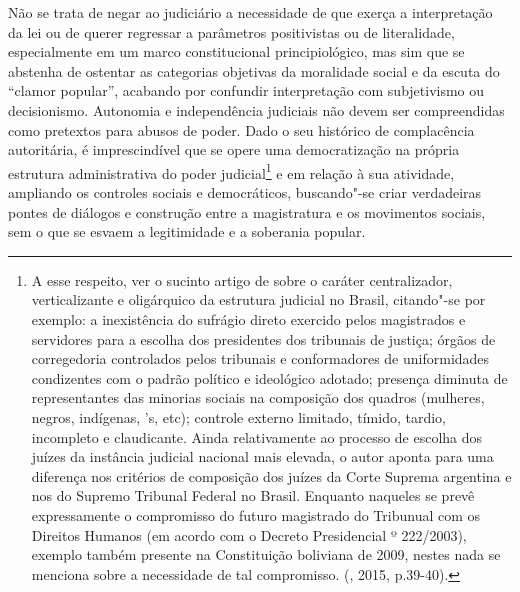 Não se trata de negar ao judiciário a necessidade de que exerça a
interpretação da lei ou de querer regressar a parâmetros positivistas ou
de literalidade, especialmente em um marco constitucional
principiológico, mas sim que se abstenha de ostentar as categorias
objetivas da moralidade social e da escuta do ``clamor popular'', acabando
por confundir interpretação com subjetivismo ou decisionismo. Autonomia
e independência judiciais não devem ser compreendidas como pretextos
para abusos de poder. Dado o seu histórico de complacência autoritária,
é imprescindível que se opere uma democratização na própria estrutura
administrativa do poder judicial\footnote{A esse respeito, ver o sucinto
  artigo de  sobre o caráter centralizador, verticalizante
  e oligárquico da estrutura judicial no Brasil, citando"-se por exemplo:
  a inexistência do sufrágio direto exercido pelos magistrados e
  servidores para a escolha dos presidentes dos tribunais de justiça;
  órgãos de corregedoria controlados pelos tribunais e conformadores de
  uniformidades condizentes com o padrão político e ideológico adotado;
  presença diminuta de representantes das minorias sociais na composição
  dos quadros (mulheres, negros, indígenas, 's, etc); controle
  externo limitado, tímido, tardio, incompleto e claudicante. Ainda
  relativamente ao processo de escolha dos juízes da instância judicial
  nacional mais elevada, o autor aponta para uma diferença nos critérios
  de composição dos juízes da Corte Suprema argentina e nos do Supremo
  Tribunal Federal no Brasil. Enquanto naqueles se prevê expressamente o
  compromisso do futuro magistrado do Tribunual com os Direitos Humanos
  (em acordo com o Decreto Presidencial º 222/2003), exemplo também
  presente na Constituição boliviana de 2009, nestes nada se menciona
  sobre a necessidade de tal compromisso. (, 2015,
  p.39-40).} e em relação à sua atividade, ampliando os controles
sociais e democráticos, buscando"-se criar verdadeiras pontes de diálogos
e construção entre a magistratura e os movimentos sociais, sem o que se
esvaem a legitimidade e a soberania popular.

